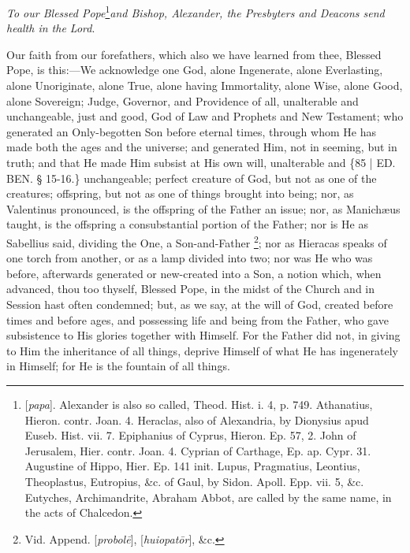 \emph{To our Blessed Pope}\footnote{[\emph{papa}]. Alexander is also so called, Theod. Hist. i. 4, p. 749.
Athanatius, Hieron. contr. Joan. 4. Heraclas, also of Alexandria, by
Dionysius apud Euseb. Hist. vii. 7. Epiphanius of Cyprus, Hieron. Ep.
57, 2. John of Jerusalem, Hier. contr. Joan. 4. Cyprian of Carthage,
Ep. ap. Cypr. 31. Augustine of Hippo, Hier. Ep. 141 init. Lupus,
Pragmatius, Leontius, Theoplastus, Eutropius, \&c. of Gaul, by
Sidon. Apoll. Epp. vii. 5, \&c. Eutyches, Archimandrite, Abraham
Abbot, are called by the same name, in the acts of Chalcedon.}\emph{and Bishop, Alexander, the Presbyters and Deacons send
health in the Lord}.

Our faith from our
forefathers, which also we have learned from thee, Blessed Pope, is
this:—We acknowledge one God, alone Ingenerate, alone Everlasting,
alone Unoriginate, alone True, alone having Immortality, alone Wise,
alone Good, alone Sovereign; Judge, Governor, and Providence of all,
unalterable and unchangeable, just and good, God of Law and Prophets and
New Testament; who generated an Only-begotten Son before eternal
times, through whom He has made both the ages and the universe; and
generated Him, not in seeming, but in truth; and that He made Him
subsist at His own will, unalterable and \{85 | ED. BEN.
§ 15-16.\} unchangeable; perfect creature of God, but not as one of
the creatures; offspring, but not as one of things brought into being;
nor, as Valentinus pronounced, is the offspring of the Father an
issue; nor, as Manichæus taught, is the offspring a consubstantial
portion of the Father; nor is He as Sabellius said, dividing the One,
a Son-and-Father \footnote{Vid. Append. [\emph{probol\={e}}], [\emph{huiopat\={o}r}],
\&c.}; nor
as Hieracas speaks of one torch from another, or as a lamp divided
into two; nor was He who was before, afterwards generated or
new-created into a Son, a notion which, when advanced, thou too
thyself, Blessed Pope, in the midst of the Church and in Session hast
often condemned; but, as we say, at the will of God, created before
times and before ages, and possessing life and being from the Father,
who gave subsistence to His glories together with Himself. For the
Father did not, in giving to Him the inheritance of all things,
deprive Himself of what He has ingenerately in Himself; for He is the
fountain of all things.

